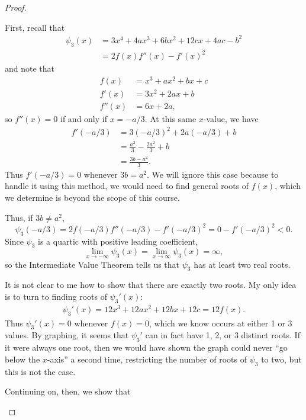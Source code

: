 \documentclass[12pt]{article}
\theoremstyle{definition}
\begin{document}
\begin{proof}
\begin{enumerate}[label=(\alph*)]
		      First, recall that \begin{align*}
			      \psi_3(x) & = 3x^4 + 4ax^3 + 6bx^2 + 12cx + 4ac - b^2 \\
			                & = 2f(x)f''(x)-f'(x)^2
		      \end{align*} and note that \begin{align*}
			      f(x)   & = x^3 + ax^2 + bx + c \\
			      f'(x)  & = 3x^2 + 2ax + b      \\
			      f''(x) & = 6x + 2a,
		      \end{align*}
		      so $f''(x) = 0$ if and only if $x = -a/3$.
		      At this same $x$-value, we have \begin{align*}
			      f'(-a/3) & = 3(-a/3)^2 + 2a(-a/3) + b           \\
			               & = \frac{a^2}{3} - \frac{2a^2}{3} + b \\
			               & = \frac{3b - a^2}{3}.
		      \end{align*}
		      Thus $f'(-a/3) = 0$ whenever $3b = a^2$.
		      We will ignore this case because to handle it using this method, we would need to find general roots of $f(x)$, which we determine is beyond the scope of this course.

		      Thus, if $3b \neq a^2$, \begin{equation*}
			      \psi_3(-a/3) = 2f(-a/3)f''(-a/3) - f'(-a/3)^2 = 0 - f'(-a/3)^2 < 0.
		      \end{equation*}
		      Since $\psi_3$ is a quartic with positive leading coefficient, \begin{equation*}
			      \lim_{x \to -\infty} \psi_3(x) = \lim_{x \to \infty} \psi_3(x) = \infty,
		      \end{equation*}
		      so the Intermediate Value Theorem tells us that $\psi_3$ has at least two real roots.

		      It is not clear to me how to show that there are exactly two roots.
		      My only idea is to turn to finding roots of $\psi_3'(x)$: \begin{align*}
			      \psi_3'(x) = 12x^3 + 12ax^2 + 12bx + 12c = 12f(x).
		      \end{align*}
		      Thus $\psi_3'(x) = 0$ whenever $f(x) = 0$, which we know occurs at either 1 or 3 values.
		      By graphing, it seems that $\psi_3'$ can in fact have 1, 2, or 3 distinct roots.
		      If it were always one root, then we would have shown the graph could never ``go below the $x$-axis'' a second time, restricting the number of roots of $\psi_3$ to two, but this is not the case.

		      Continuing on, then, we show that
	\end{enumerate}
\end{proof}
\end{document}
